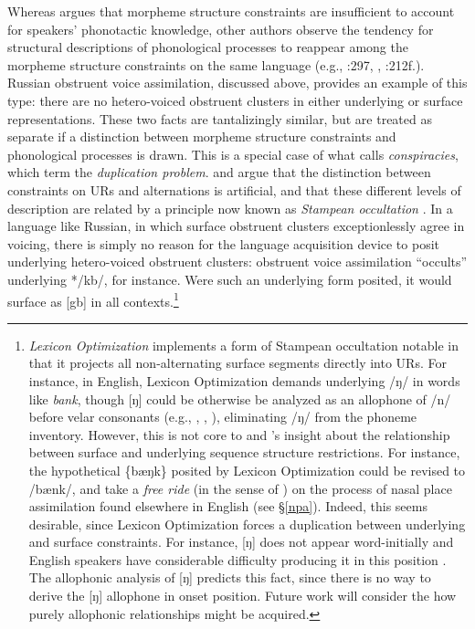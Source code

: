 Whereas \citeauthor{Shibatani1973} argues that morpheme structure constraints are insufficient to account for speakers' phonotactic knowledge, other authors observe the tendency for structural descriptions of phonological processes to reappear among the morpheme structure constraints on the same language (e.g., \citealt{Hale1965}:297, \citealt{Kisseberth1970b}, \citealt{Postal1968}:212f.).
Russian obstruent voice assimilation, discussed above, provides an example of this type: there are no hetero-voiced obstruent clusters in either underlying or surface representations.
These two facts are tantalizingly similar, but are treated as separate if a distinction between morpheme structure constraints and phonological processes is drawn.
This is a special case of what \citet{Kisseberth1970b} calls \emph{conspiracies}, which \citet[136]{KK77} term the \emph{duplication problem}.
\citet[205f.]{Dell1973} and \citet[28f.]{Stampe1973} argue that the distinction between constraints on URs and alternations is artificial, and that these different levels of description are related by a principle now known as \emph{Stampean occultation} \citep[54]{OT}.
In a language like Russian, in which surface obstruent clusters exceptionlessly agree in voicing, there is simply no reason for the language acquisition device to posit underlying hetero-voiced obstruent clusters: obstruent voice assimilation ``occults'' underlying */kb/, for instance. Were such an underlying form posited, it would surface as [gb] in all contexts.\footnote{
    \emph{Lexicon Optimization} \citep[209]{OT} implements a form of Stampean occultation notable in that it projects all non-alternating surface segments directly into URs.
    For instance, in English, Lexicon Optimization demands underlying /ŋ/ in words like \emph{bank}, though [ŋ] could be otherwise be analyzed as an allophone of /n/ before velar consonants (e.g., \citealt[65f.]{Borowsky1986}, \citealt[85]{SPE}, \citealt[62]{Halle1985a}), eliminating /ŋ/ from the phoneme inventory.
    However, this is not core to \citeauthor{Dell1973} and \citeauthor{Stampe1973}'s insight about the relationship between surface and underlying sequence structure restrictions.
    For instance, the hypothetical \{bæŋk\} posited by Lexicon Optimization could be revised to /bænk/, and take a \emph{free ride} (in the sense of \citealt{Zwicky1970}) on the process of nasal place assimilation found elsewhere in English (see \S\ref{npa}).
    Indeed, this seems desirable, since Lexicon Optimization forces a duplication between underlying and surface constraints.
    For instance, [ŋ] does not appear word-initially and English speakers have considerable difficulty producing it in this position \citep{Rusaw2009}.
    The allophonic analysis of [ŋ] predicts this fact, since there is no way to derive the [ŋ] allophone in onset position.
    Future work will consider the how purely allophonic relationships might be acquired.}
